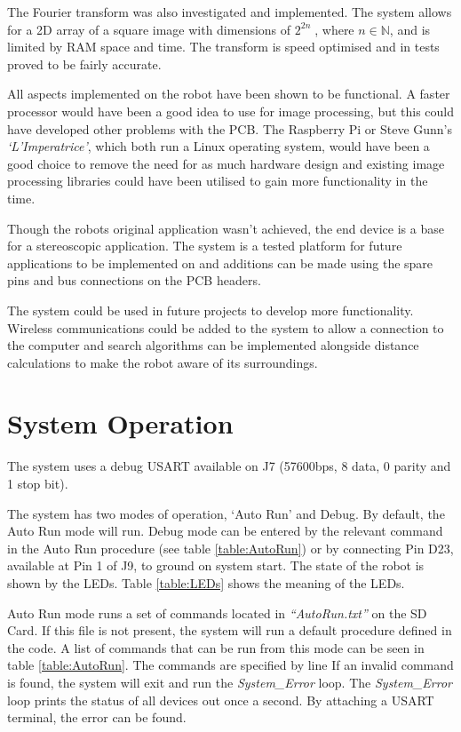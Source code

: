 The Fourier transform was also investigated and implemented. The system allows for a 2D array of a square image with dimensions of $2^{2n}\; $, where $n \in \mathbb{N}$, and is limited by RAM space and time. The transform is speed optimised and in tests proved to be fairly accurate. 

All aspects implemented on the robot have been shown to be functional. A faster processor would have been a good idea to use for image processing, but this could have developed other problems with the PCB. The Raspberry Pi or Steve Gunn's \textit{`L'Imperatrice'}, which both run a Linux operating system, would have been a good choice to remove the need for as much hardware design and existing image processing libraries could have been utilised to gain more functionality in the time. 

Though the robots original application wasn't achieved, the end device is a base for a stereoscopic application. The system is a tested platform for future applications to be implemented on and additions can be made using the spare pins and bus connections on the PCB headers. 

The system could be used in future projects to develop more functionality. Wireless communications could be added to the system to allow a connection to the computer and search algorithms can be implemented alongside distance calculations to make the robot aware of its surroundings. 

\section{System Operation}

The system uses a debug USART available on J7 (57600bps, 8 data, 0 parity and 1 stop bit).

The system has two modes of operation, `Auto Run' and Debug. By default, the Auto Run mode will run. Debug mode can be entered by the relevant command in the Auto Run procedure (see table \ref{table:AutoRun}) or by connecting Pin D23, available at Pin 1 of J9, to ground on system start. The state of the robot is shown by the LEDs. Table \ref{table:LEDs} shows the meaning of the LEDs.

Auto Run mode runs a set of commands located in \textit{``AutoRun.txt''} on the SD Card. If this file is not present, the system will run a default procedure defined in the code. A list of commands that can be run from this mode can be seen in table \ref{table:AutoRun}. The commands are specified by line If an invalid command is found, the system will exit and run the \textit{System\_Error} loop. The  \textit{System\_Error} loop prints the status of all devices out once a second. By attaching a USART terminal, the error can be found.


